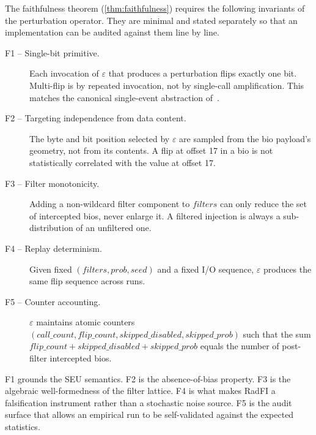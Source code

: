 The faithfulness theorem (\cref{thm:faithfulness}) requires the
following invariants of the perturbation operator. They are minimal
and stated separately so that an implementation can be audited
against them line by line.

\begin{description}
\item[F1 -- Single-bit primitive.] Each invocation of
  \(\varepsilon\) that produces a perturbation flips exactly one
  bit. Multi-flip is by repeated invocation, not by single-call
  amplification. This matches the canonical single-event abstraction
  of~\cite{dodd2003seu,baumann2005softerrors}.
\item[F2 -- Targeting independence from data content.] The byte and
  bit position selected by \(\varepsilon\) are sampled from the bio
  payload's geometry, not from its contents. A flip at offset 17 in
  a bio is not statistically correlated with the value at offset 17.
\item[F3 -- Filter monotonicity.] Adding a non-wildcard filter
  component to \(\mathit{filters}\) can only reduce the set of
  intercepted bios, never enlarge it. A filtered injection is always
  a sub-distribution of an unfiltered one.
\item[F4 -- Replay determinism.] Given fixed
  \((\mathit{filters}, \mathit{prob}, \mathit{seed})\) and a fixed
  I/O sequence, \(\varepsilon\) produces the same flip sequence
  across runs.
\item[F5 -- Counter accounting.] \(\varepsilon\) maintains atomic
  counters \((\mathit{call\_count}, \mathit{flip\_count},
  \mathit{skipped\_disabled}, \mathit{skipped\_prob})\) such that
  the sum
  \(\mathit{flip\_count} + \mathit{skipped\_disabled} + \mathit{skipped\_prob}\)
  equals the number of post-filter intercepted bios.
\end{description}

F1 grounds the SEU semantics. F2 is the absence-of-bias property.
F3 is the algebraic well-formedness of the filter lattice. F4 is
what makes RadFI a falsification instrument rather than a stochastic
noise source. F5 is the audit surface that allows an empirical run
to be self-validated against the expected statistics.
